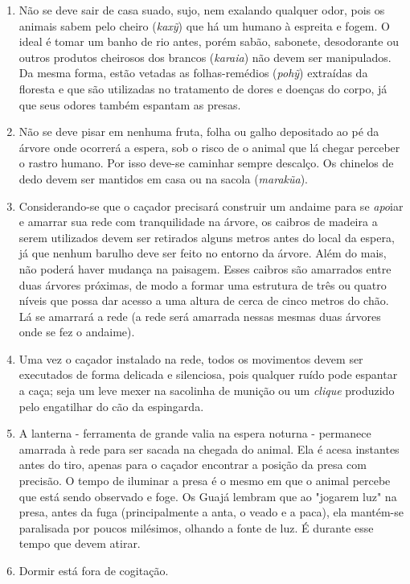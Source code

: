 \begin{enumerate}
\def\labelenumi{\arabic{enumi}.}
\item
  Não se deve sair de casa suado, sujo, nem exalando qualquer odor, pois
  os animais sabem pelo cheiro (\emph{kaxỹ}) que há um humano à espreita
  e fogem. O ideal é tomar um banho de rio antes, porém sabão, sabonete,
  desodorante ou outros produtos cheirosos dos brancos (\emph{karaia})
  não devem ser manipulados. Da mesma forma, estão vetadas as
  folhas-remédios (\emph{pohỹ}) extraídas da floresta e que são
  utilizadas no tratamento de dores e doenças do corpo, já que seus
  odores também espantam as presas.
\item
  Não se deve pisar em nenhuma fruta, folha ou galho depositado ao pé da
  árvore onde ocorrerá a espera, sob o risco de o animal que lá chegar
  perceber o rastro humano. Por isso deve-se caminhar sempre descalço.
  Os chinelos de dedo devem ser mantidos em casa ou na sacola
  (\emph{marakũa}).
\item
  Considerando-se que o caçador precisará construir um andaime para se
  \emph{apo}iar e amarrar sua rede com tranquilidade na árvore, os
  caibros de madeira a serem utilizados devem ser retirados alguns
  metros antes do local da espera, já que nenhum barulho deve ser feito
  no entorno da árvore. Além do mais, não poderá haver mudança na
  paisagem. Esses caibros são amarrados entre duas árvores próximas, de
  modo a formar uma estrutura de três ou quatro níveis que possa dar
  acesso a uma altura de cerca de cinco metros do chão. Lá se amarrará a
  rede (a rede será amarrada nessas mesmas duas árvores onde se fez o
  andaime).
\item
  Uma vez o caçador instalado na rede, todos os movimentos devem ser
  executados de forma delicada e silenciosa, pois qualquer ruído pode
  espantar a caça; seja um leve mexer na sacolinha de munição ou um
  \emph{clique} produzido pelo engatilhar do cão da espingarda.
\item
  A lanterna - ferramenta de grande valia na espera noturna - permanece
  amarrada à rede para ser sacada na chegada do animal. Ela é acesa
  instantes antes do tiro, apenas para o caçador encontrar a posição da
  presa com precisão. O tempo de iluminar a presa é o mesmo em que o
  animal percebe que está sendo observado e foge. Os Guajá lembram que
  ao "jogarem luz" na presa, antes da fuga (principalmente a anta, o
  veado e a paca), ela mantém-se paralisada por poucos milésimos,
  olhando a fonte de luz. É durante esse tempo que devem atirar.
\item
  Dormir está fora de cogitação.
\end{enumerate}

